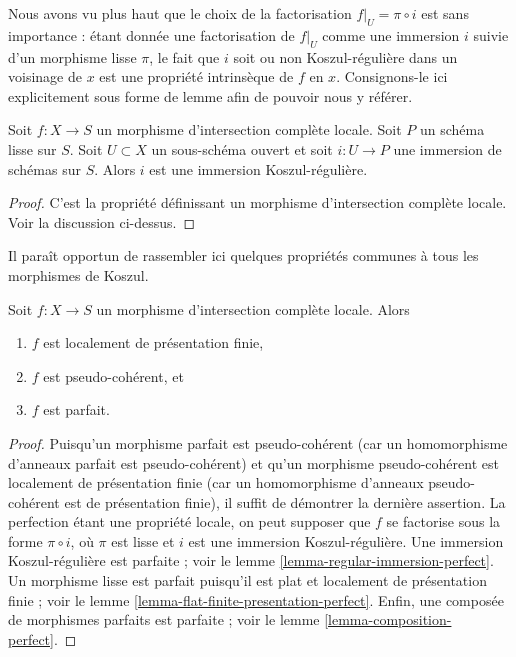 \noindent
Nous avons vu plus haut que le choix de la factorisation
$f|_U = \pi \circ i$ est sans importance : étant donnée une factorisation
de $f|_U$ comme une immersion $i$ suivie d'un morphisme lisse $\pi$, le fait que
$i$ soit ou non Koszul-régulière dans un voisinage de $x$ est une propriété
intrinsèque de $f$ en $x$. Consignons-le ici explicitement sous forme de lemme
afin de pouvoir nous y référer.

\begin{lemma}
\label{lemma-lci}
Soit $f : X \to S$ un morphisme d'intersection complète locale.
Soit $P$ un schéma lisse sur $S$. Soit $U \subset X$ un sous-schéma ouvert
et soit $i : U \to P$ une immersion de schémas sur $S$.
Alors $i$ est une immersion Koszul-régulière.
\end{lemma}

\begin{proof}
C'est la propriété définissant un morphisme d'intersection complète
locale. Voir la discussion ci-dessus.
\end{proof}

\noindent
Il paraît opportun de rassembler ici quelques propriétés communes
à tous les morphismes de Koszul.

\begin{lemma}
\label{lemma-lci-properties}
Soit $f : X \to S$ un morphisme d'intersection complète locale.
Alors
\begin{enumerate}
\item $f$ est localement de présentation finie,
\item $f$ est pseudo-cohérent, et
\item $f$ est parfait.
\end{enumerate}
\end{lemma}

\begin{proof}
Puisqu'un morphisme parfait est pseudo-cohérent
(car un homomorphisme d'anneaux parfait est pseudo-cohérent)
et qu'un morphisme pseudo-cohérent est localement de présentation finie
(car un homomorphisme d'anneaux pseudo-cohérent est de présentation finie),
il suffit de démontrer la dernière assertion. La perfection étant une propriété
locale, on peut supposer que $f$ se factorise sous la forme $\pi \circ i$, où
$\pi$ est lisse et $i$ est une immersion Koszul-régulière.
Une immersion Koszul-régulière est parfaite ; voir
le lemme \ref{lemma-regular-immersion-perfect}.
Un morphisme lisse est parfait puisqu'il est plat et localement de
présentation finie ; voir
le lemme \ref{lemma-flat-finite-presentation-perfect}.
Enfin, une composée de morphismes parfaits est parfaite ; voir
le lemme \ref{lemma-composition-perfect}.
\end{proof}


